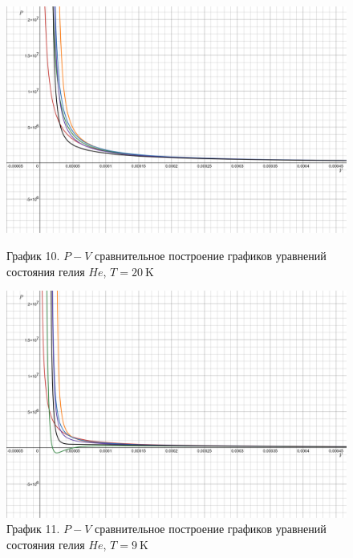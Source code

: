 \documentclass[a4paper]{article}
\numberwithin{equation}{subsection} %
\begin{document}
\begin{figure}[h!]
    \centering
    \begin{minipage}{0.49\textwidth}
        \centering
        \includegraphics[width=\linewidth]{Graphics/He/20.png}
        \caption{\label{fig:clausius_1}График 10. $P-V$ сравнительное построение графиков уравнений состояния гелия $He$, $T = 20 \ \text{K}$}
    \end{minipage}
    \hfill
    \begin{minipage}{0.49\textwidth}
        \centering
        \includegraphics[width=\linewidth]{Graphics/He/9.png}
        \caption{\label{fig:clausius_1}График 11. $P-V$ сравнительное построение графиков уравнений состояния гелия $He$, $T = 9 \ \text{K}$}
    \end{minipage}
\end{figure}
\clearpage
\end{document}
